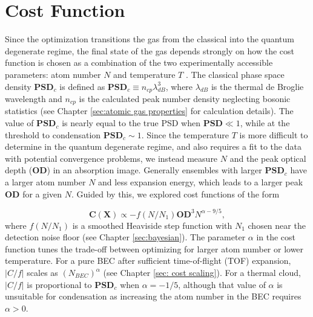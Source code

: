 \documentclass{article}
\begin{document}
\section{Cost Function}
Since the optimization transitions the gas from the classical into the quantum degenerate regime, the final state of the gas depends strongly on how the cost function is chosen as a combination of the two experimentally accessible parameters: atom number $N$ and temperature $T$ . The classical phase space density $\mathbf{PSD}_c$ is defined as $\mathbf{PSD}_c \equiv n_{cp} \lambda_{dB}^3$, where $\lambda_{dB}$ is the thermal de Broglie wavelength and $n_{cp}$ is the calculated peak number density neglecting bosonic statistics (see Chapter \ref{sec:atomic gas properties} for calculation details). The value of $\mathbf{PSD}_c$ is nearly equal to the true PSD when $\mathbf{PSD} \ll 1$, while at the threshold to condensation $\mathbf{PSD}_c \sim 1$. Since the temperature $T$ is more difficult to determine in the quantum degenerate regime, and also requires a fit to the data with potential convergence problems, we instead measure $N$ and the peak optical depth ($\mathbf{OD}$) in an absorption image. Generally ensembles with larger $\mathbf{PSD}_c$ have a larger atom number $N$ and less expansion energy, which leads to a larger peak $\mathbf{OD}$ for a given $N$. Guided by this, we explored cost functions of the form

\begin{equation}
    \mathbf{C}(\mathbf{X}) \propto -f(N/N_1) \mathbf{OD}^3 N^{\alpha - 9/5},
\end{equation}
where $f(N/N_1)$ is a smoothed Heaviside step function with $N_1$ chosen near the detection noise floor (see Chapter \ref{sec:bayesian}). The parameter $\alpha$ in the cost function tunes the trade-off between optimizing for larger atom number or lower temperature. For a pure BEC after sufficient time-of-flight (TOF) expansion, $|C/f|$ scales as $(N_{BEC})^\alpha$ (see Chapter \ref{sec: cost scaling}). For a thermal cloud, $|C/ f |$ is proportional to $\mathbf{PSD}_c$ when $\alpha = -1/5$, although that value of $\alpha$ is unsuitable for condensation as increasing the atom number in the BEC requires $\alpha > 0$.
\end{document}
